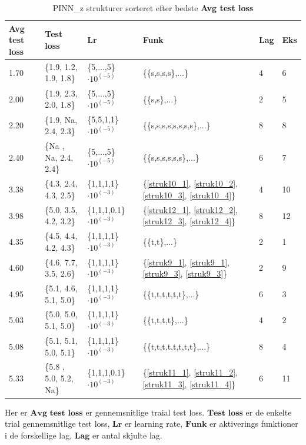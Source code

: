 \begin{table}[H]
    \centering
    \begin{tabular}{|l|l|l|l|l|l|}
        \hline
        \textbf{Avg test loss} & \textbf{Test loss} & \textbf{Lr} & \textbf{Funk} & \textbf{Lag} & \textbf{Eks}\\ \hline
        1.70 & \{1.9, 1.2, 1.9, 1.8\} & \{5,...,5\}  $\cdot 10^{(-5)}$ & \{\{s,s,s,s\},...\}                                                    & 4 & 6  \\ \hline
        2.00 & \{1.9, 2.3, 2.0, 1.8\} & \{5,...,5\}  $\cdot 10^{(-5)}$ & \{\{s,s\},...\}                                                        & 2 & 5 \\ \hline
        2.20 & \{1.9, Na,  2.4, 2.3\} & \{5,5,1,1\}  $\cdot 10^{(-5)}$ & \{\{s,s,s,s,s,s,s,s\},...\}                                            & 8 & 8 \\ \hline
        2.40 & \{Na , Na,  2.4, 2.4\} & \{5,...,5\}  $\cdot 10^{(-5)}$ & \{\{s,s,s,s,s,s\},...\}                                                & 6 & 7 \\ \hline
        3.38 & \{4.3, 2.4, 4.3, 2.5\} & \{1,1,1,1\}  $\cdot 10^{(-3)}$ & \{\ref{struk10_1}, \ref{struk10_2}, \ref{struk10_3}, \ref{struk10_4}\} & 4 & 10 \\ \hline
        3.98 & \{5.0, 3.5, 4.2, 3.2\} & \{1,1,1,0.1\}$\cdot 10^{(-3)}$ & \{\ref{struk12_1}, \ref{struk12_2}, \ref{struk12_3}, \ref{struk12_4}\} & 8 & 12 \\ \hline
        4.35 & \{4.5, 4.4, 4.2, 4.3\} & \{1,1,1,1\}  $\cdot 10^{(-3)}$ & \{\{t,t\},...\}                                                        & 2 & 1 \\ \hline
        4.60 & \{4.6, 7.7, 3.5, 2.6\} & \{1,1,1,1\}  $\cdot 10^{(-3)}$ & \{\ref{struk9_1}, \ref{struk9_1}, \ref{struk9_3}, \ref{struk9_3}\}     & 2 & 9 \\ \hline
        4.95 & \{5.1, 4.6, 5.1, 5.0\} & \{1,1,1,1\}  $\cdot 10^{(-3)}$ & \{\{t,t,t,t,t,t\},...\}                                                & 6 & 3 \\ \hline
        5.03 & \{5.0, 5.0, 5.1, 5.0\} & \{1,1,1,1\}  $\cdot 10^{(-3)}$ & \{\{t,t,t,t\},...\}                                                    & 4 & 2 \\ \hline
        5.08 & \{5.1, 5.1, 5.0, 5.1\} & \{1,1,1,1\}  $\cdot 10^{(-3)}$ & \{\{t,t,t,t,t,t,t,t\},...\}                                            & 8 & 4 \\ \hline
        5.33 & \{5.8 , 5.0, 5.2, Na\} & \{1,1,1,0.1\}$\cdot 10^{(-3)}$ & \{\ref{struk11_1}, \ref{struk11_2}, \ref{struk11_3}, \ref{struk11_4}\} & 6 & 11 \\ \hline
    \end{tabular}
    \caption{PINN\_z strukturer sorteret efter bedste \textbf{Avg test loss}}\label{tbl:pinn_z_strukturer}
\end{table}
Her er $\textbf{Avg test loss}$ er gennemsnitlige traial test loss. $\textbf{Test loss}$ er de enkelte trial gennemsnitlige test loss, $\textbf{Lr}$ er learning rate, 
$\textbf{Funk}$ er aktiverings funktioner i de forskellige lag, $\textbf{Lag}$ er antal skjulte lag.


